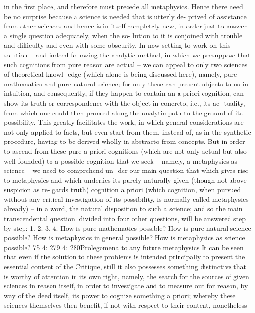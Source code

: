 in the ﬁrst place, and therefore must precede all metaphysics. Hence
there need be no surprise because a science is needed that is utterly de-
prived of assistance from other sciences and hence is in itself completely
new, in order just to answer a single question adequately, when the so-
lution to it is conjoined with trouble and difﬁculty and even with some
obscurity.
In now setting to work on this solution – and indeed following the
analytic method, in which we presuppose that such cognitions from pure
reason are actual – we can appeal to only two sciences of theoretical knowl-
edge (which alone is being discussed here), namely, pure mathematics and
pure natural science; for only these can present objects to us in intuition,
and consequently, if they happen to contain an a priori cognition, can
show its truth or correspondence with the object in concreto, i.e., its ac-
tuality, from which one could then proceed along the analytic path to
the ground of its possibility. This greatly facilitates the work, in which
general considerations are not only applied to facts, but even start from
them, instead of, as in the synthetic procedure, having to be derived
wholly in abstracto from concepts.
But in order to ascend from these pure a priori cognitions (which are
not only actual but also well-founded) to a possible cognition that we
seek – namely, a metaphysics as science – we need to comprehend un-
der our main question that which gives rise to metaphysics and which
underlies its purely naturally given (though not above suspicion as re-
gards truth) cognition a priori (which cognition, when pursued without
any critical investigation of its possibility, is normally called metaphysics
already) – in a word, the natural disposition to such a science; and so the
main transcendental question, divided into four other questions, will be
answered step by step:
1.
2.
3.
4.
How is pure mathematics possible?
How is pure natural science possible?
How is metaphysics in general possible?
How is metaphysics as science possible?
75
4: 279
4: 280Prolegomena to any future metaphysics
It can be seen that even if the solution to these problems is intended
principally to present the essential content of the Critique, still it also
possesses something distinctive that is worthy of attention in its own
right, namely, the search for the sources of given sciences in reason itself,
in order to investigate and to measure out for reason, by way of the deed
itself, its power to cognize something a priori; whereby these sciences
themselves then beneﬁt, if not with respect to their content, nonetheless
